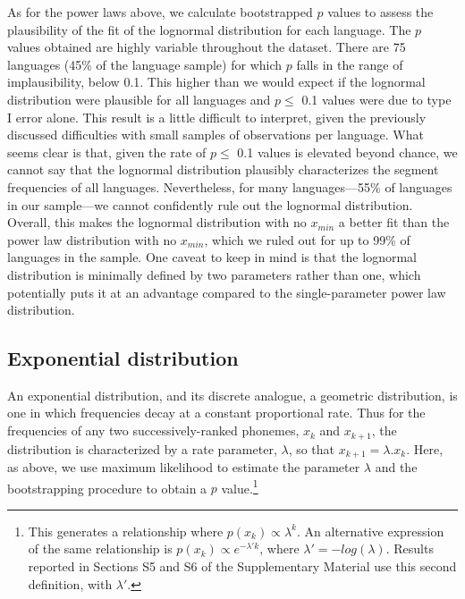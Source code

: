 As for the power laws above, we calculate bootstrapped \(p\) values to assess the plausibility of the fit of the lognormal distribution for each language. The \(p\) values obtained are highly variable throughout the dataset. There are 75 languages (45\% of the language sample) for which \(p\) falls in the range of implausibility, below 0.1. This higher than we would expect if the lognormal distribution were plausible for all languages and \(p \leq\) 0.1 values were due to type I error alone. This result is a little difficult to interpret, given the previously discussed difficulties with small samples of observations per language. What seems clear is that, given the rate of \(p \leq\) 0.1 values is elevated beyond chance, we cannot say that the lognormal distribution plausibly characterizes the segment frequencies of all languages. Nevertheless, for many languages---55\% of languages in our sample---we cannot confidently rule out the lognormal distribution. Overall, this makes the lognormal distribution with no \(x_{min}\) a better fit than the power law distribution with no \(x_{min}\), which we ruled out for up to 99\% of languages in the sample. One caveat to keep in mind is that the lognormal distribution is minimally defined by two parameters rather than one, which potentially puts it at an advantage compared to the single-parameter power law distribution. \newline

\hypertarget{exponential-distribution}{%
\subsection*{Exponential distribution}\label{exponential-distribution}}

An exponential distribution, and its discrete analogue, a geometric distribution, is one in which frequencies decay at a constant proportional rate. Thus for the frequencies of any two successively-ranked phonemes, \(x_k\) and \(x_{k+1}\), the distribution is characterized by a rate parameter, \(\lambda\), so that \(x_{k+1} = \lambda.x_k\). Here, as above, we use maximum likelihood to estimate the parameter \(\lambda\) and the bootstrapping procedure to obtain a \(p\) value.\footnote{This generates a relationship where \(p(x_k) \propto \lambda^k\). An alternative expression of the same relationship is \(p(x_k) \propto e^{-\lambda' k}\), where \(\lambda' = -log(\lambda)\). Results reported in Sections S5 and S6 of the Supplementary Material use this second definition, with \(\lambda'\).}

